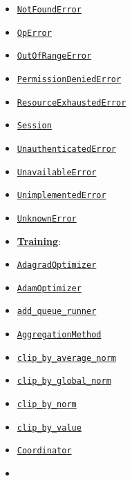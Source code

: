 \begin{itemize}
\item
  \href{../../api_docs/python/client.md\#NotFoundError}{\texttt{NotFoundError}}
\item
  \href{../../api_docs/python/client.md\#OpError}{\texttt{OpError}}
\item
  \href{../../api_docs/python/client.md\#OutOfRangeError}{\texttt{OutOfRangeError}}
\item
  \href{../../api_docs/python/client.md\#PermissionDeniedError}{\texttt{PermissionDeniedError}}
\item
  \href{../../api_docs/python/client.md\#ResourceExhaustedError}{\texttt{ResourceExhaustedError}}
\item
  \href{../../api_docs/python/client.md\#Session}{\texttt{Session}}
\item
  \href{../../api_docs/python/client.md\#UnauthenticatedError}{\texttt{UnauthenticatedError}}
\item
  \href{../../api_docs/python/client.md\#UnavailableError}{\texttt{UnavailableError}}
\item
  \href{../../api_docs/python/client.md\#UnimplementedError}{\texttt{UnimplementedError}}
\item
  \href{../../api_docs/python/client.md\#UnknownError}{\texttt{UnknownError}}
\item
  \textbf{\href{../../api_docs/python/train.md}{Training}}:
\item
  \href{../../api_docs/python/train.md\#AdagradOptimizer}{\texttt{AdagradOptimizer}}
\item
  \href{../../api_docs/python/train.md\#AdamOptimizer}{\texttt{AdamOptimizer}}
\item
  \href{../../api_docs/python/train.md\#add_queue_runner}{\texttt{add\_queue\_runner}}
\item
  \href{../../api_docs/python/train.md\#AggregationMethod}{\texttt{AggregationMethod}}
\item
  \href{../../api_docs/python/train.md\#clip_by_average_norm}{\texttt{clip\_by\_average\_norm}}
\item
  \href{../../api_docs/python/train.md\#clip_by_global_norm}{\texttt{clip\_by\_global\_norm}}
\item
  \href{../../api_docs/python/train.md\#clip_by_norm}{\texttt{clip\_by\_norm}}
\item
  \href{../../api_docs/python/train.md\#clip_by_value}{\texttt{clip\_by\_value}}
\item
  \href{../../api_docs/python/train.md\#Coordinator}{\texttt{Coordinator}}
\item

\end{itemize}
